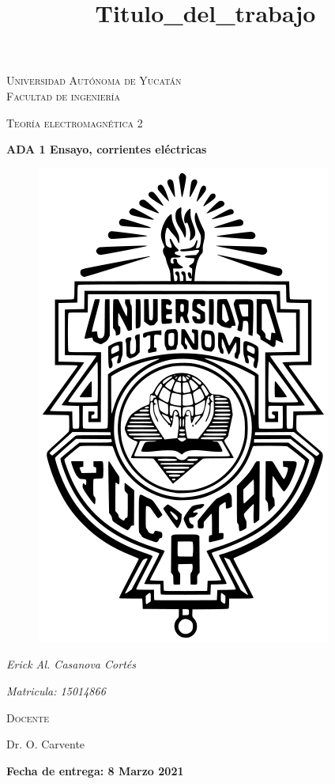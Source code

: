 \documentclass[11pt]{report}
\theoremstyle{plain}
\theoremstyle{definition}
\begin{document}
\begin{titlepage}
\title{Titulo_del_trabajo}


	\centering
	{\scshape\LARGE Universidad Autónoma de Yucatán  \\ Facultad de ingeniería\par}
	\vspace{1cm}
	{\scshape\Large Teoría electromagnética 2\par}
	\vspace{1.5cm}
	{\huge\bfseries ADA 1 Ensayo, corrientes eléctricas\par}
	\vspace{0.7cm}
	{\begin{figure}[!h]
	\centering
    \includegraphics[scale=0.3]{UADY.png}
	\end{figure}}
	\vspace{0.7cm}
	{\Large\itshape Erick Al. Casanova Cortés\par}
	{\Large\itshape Matricula: 15014866\par}
	\vfill
	{\scshape\Large Docente\par
	Dr. O. Carvente\par}
	\vfill
	{\Large{\bfseries Fecha de entrega: 8 Marzo 2021} }

	\vfill
	
\end{titlepage}
\end{document}
